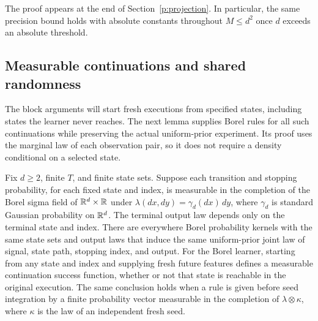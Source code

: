 The proof appears at the end of Section~\ref{p:projection}. In particular,
the same precision bound holds with absolute constants throughout
\(M\le d^2\) once \(d\) exceeds an absolute threshold.

\subsection{Measurable continuations and shared randomness}

The block arguments will start fresh executions from specified states,
including states the learner never reaches. The next lemma supplies Borel
rules for all such continuations while preserving the actual uniform-prior
experiment. Its proof uses the marginal law of each observation pair,
so it does not require a density conditional on a selected state.

\begin{lemma}
\label{p:borel-kernels}
Fix \(d\ge2\), finite \(T\), and finite state sets. Suppose each transition
and stopping probability, for each fixed state and index, is measurable in
the completion of the Borel sigma field of \(\mathbb R^d\times\mathbb R\) under
\(\lambda(dx,dy)=\gamma_d(dx)\,dy\), where \(\gamma_d\) is standard
Gaussian probability on \(\mathbb R^d\). The terminal output law depends only on
the terminal state and index. There are everywhere Borel probability
kernels with the same state sets and output laws that induce the same
uniform-prior joint law of signal, state path, stopping index, and output.
For the Borel learner, starting from any state and index and supplying fresh
future features defines a measurable continuation success function, whether
or not that state is reachable in the original execution.
The same conclusion holds when a rule is given before seed integration by
a finite probability vector measurable in the completion of
\(\lambda\otimes\kappa\), where \(\kappa\) is the law of an independent
fresh seed.
\end{lemma}

